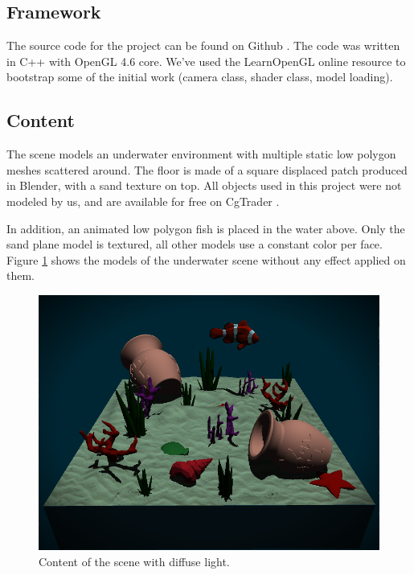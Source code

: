\documentclass{article}
\begin{document}
\subsection{Framework}

The source code for the project can be found on Github \cite{watercolor_underwater}. 
The code was written in C++ with OpenGL 4.6 core. We've used the LearnOpenGL \cite{learnopengl} 
online resource to bootstrap some of the initial work (camera class, shader class, model loading).

\subsection{Content}
The scene models an underwater environment with multiple static low polygon meshes scattered around. 
The floor is made of a square displaced patch produced in Blender, with a sand texture on top. 
All objects used in this project were not modeled by us, and are available for free on CgTrader \cite{cgtrader}.

\medskip \par
\noindent
In addition, an animated low polygon fish is placed in the water above. 
Only the sand plane model is textured, all other models use a constant color per face. 
Figure \ref{fig:scene_content} shows the models of the underwater scene without any effect applied on them.

\begin{figure}[h]
    \centering
    \includegraphics[width=.9\columnwidth]{imgs/scene_contents.png}
    \caption{Content of the scene with diffuse light.}
    \label{fig:scene_content}
\end{figure}
\end{document}
